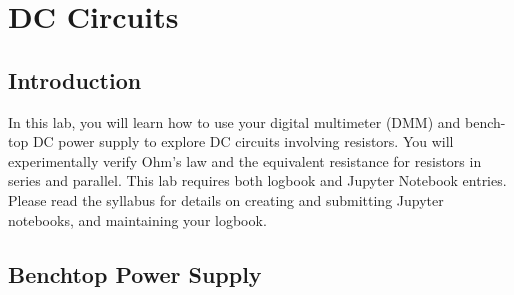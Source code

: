 \chapter{DC Circuits}


\section{Introduction}

In this lab, you will learn how to use your digital multimeter (DMM)
and bench-top DC power supply to explore DC circuits involving
resistors.  You will experimentally verify Ohm's law and the
equivalent resistance for resistors in series and parallel. This lab
requires both logbook and Jupyter Notebook entries.  Please read the
syllabus for details on creating and submitting Jupyter notebooks, and
maintaining your logbook.

\section{Benchtop Power Supply}


